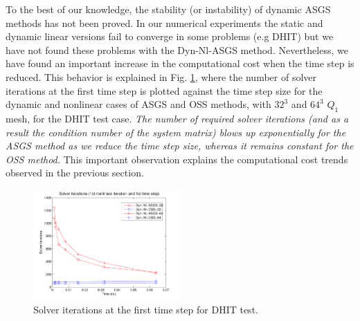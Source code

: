To the best of our knowledge, the stability (or instability) of dynamic ASGS methods has not been proved. In our numerical experiments the static and dynamic linear versions fail to converge in some problems (e.g DHIT) but we have not found these problems with the Dyn-Nl-ASGS method. Nevertheless, we have found an important increase in the computational cost when the time step is reduced. 
This behavior is explained in Fig. \ref{fig:1st_step_comp_cost}, where the number of solver iterations at the first time step is plotted against the time step size for the dynamic and nonlinear cases of ASGS and OSS methods, with $32^3$ and $64^3$ $Q_1$ mesh, for the DHIT test case. \emph{The number of required solver iterations (and as a result the condition number of the system matrix) blows up exponentially for the ASGS method as we reduce the time step size, whereas it remains constant for the OSS method.} This important observation explains the computational cost trends observed in the previous section.
\begin{figure}[h!]
	\centering	
	\includegraphics[width=0.5\textwidth]{Figures/Chapter4/DHIT/1st_step_comp_cost}
	\caption{Solver iterations at the first time step for DHIT test.}
	\label{fig:1st_step_comp_cost}
\end{figure}


%
